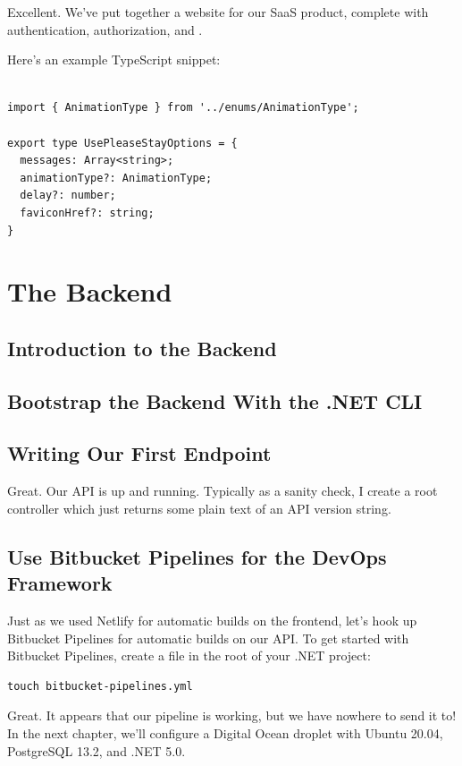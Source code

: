 \documentclass[a4paper,
                             oneside,
                             BCOR1.0cm,
                             DIV11,
                             parskip=full,
                             11pt]{scrbook}
\begin{document}
Excellent. We've put together a website for our SaaS product, complete with authentication, authorization, and .

Here's an example TypeScript snippet:

\begin{verbatim}

import { AnimationType } from '../enums/AnimationType';

export type UsePleaseStayOptions = {
  messages: Array<string>;
  animationType?: AnimationType;
  delay?: number;
  faviconHref?: string;
}

\end{verbatim}

\chapter{The Backend}\label{cap:primer}

\section{Introduction to the Backend}
\section{Bootstrap the Backend With the .NET CLI}
\section{Writing Our First Endpoint}

Great. Our API is up and running. Typically as a sanity check, I create a root controller which just returns some plain text of an API version string. 

\section{Use Bitbucket Pipelines for the DevOps Framework}

Just as we used Netlify for automatic builds on the frontend, let's hook up Bitbucket Pipelines for automatic builds on our API. To get started with Bitbucket Pipelines, create a  file in the root of your .NET project:

\begin{verbatim}
touch bitbucket-pipelines.yml  
\end{verbatim}

Great. It appears that our pipeline is working, but we have nowhere to send it to! In the next chapter, we'll configure a Digital Ocean droplet with Ubuntu 20.04, PostgreSQL 13.2, and .NET 5.0.
\end{document}
